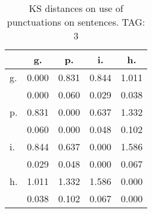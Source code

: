 \begin{table}[h!]
\begin{center}
\begin{tabular}{| l | c | c | c | c |}\hline
 & g. & p. & i. & h. \\\hline
g. & 0.000  & 0.831  & 0.844  & 1.011 \\\hline
 & 0.000  & 0.060  & 0.029  & 0.038 \\\hline
p. & 0.831  & 0.000  & 0.637  & 1.332 \\\hline
 & 0.060  & 0.000  & 0.048  & 0.102 \\\hline
i. & 0.844  & 0.637  & 0.000  & 1.586 \\\hline
 & 0.029  & 0.048  & 0.000  & 0.067 \\\hline
h. & 1.011  & 1.332  & 1.586  & 0.000 \\\hline
 & 0.038  & 0.102  & 0.067  & 0.000 \\\hline
\end{tabular}
\caption{KS distances on use of punctuations on sentences. TAG: 3}
\end{center}
\end{table}